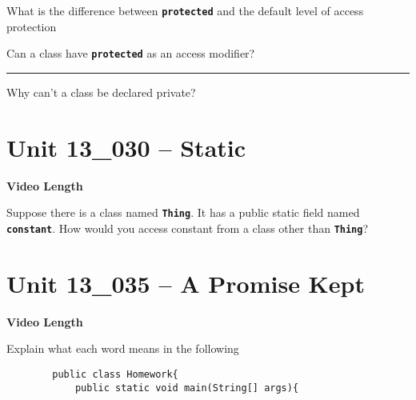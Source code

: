 \documentclass[letterpaper,12pt]{exam}
\newcommand{\unit}{Unit 13}
\begin{document}
\begin{questions}
\begin{samepage}
    \question What is the difference between \texttt{\textbf{protected}} and the default level of access protection
    \vspace{5mm}
\end{samepage}

\begin{samepage}
    \question Can a class have \texttt{\textbf{protected}} as an access modifier?
    \vspace{5mm}
\end{samepage}

\rule{20mm}{0.15mm}Why can't a class be declared private?

\section*{\unit\_030 -- Static } 
\par{\selectfont\textbf{Video Length }}
\begin{samepage}
    \question Suppose there is a class named \texttt{\textbf{Thing}}.  It has a public static field named \texttt{\textbf{constant}}.  How would you access constant from a class other than \texttt{\textbf{Thing}}?
    \vspace{5mm}
\end{samepage}


\section*{\unit\_035 -- A Promise Kept } 
\par{\selectfont\textbf{Video Length }}

\begin{samepage}
    \question Explain what each word means in the following
    \begin{verbatim}
        public class Homework{
            public static void main(String[] args){


\end{verbatim}
\end{samepage}
\end{questions}
\end{document}
